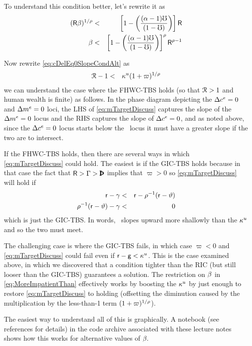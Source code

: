 \message{ !name(TractableBufferStock.tex)}\documentclass{handout}
\begin{document}
To understand this condition better, let's rewrite it as 
\begin{eqnarray}
    (\mathsf{R} \beta)^{1/\rho} & < & \left[1-\left(\frac{(\alpha-1)\mho}{ (1-\mho)}\right)\right]\mathsf{R}
\\  \beta & < & \left[1-\left(\frac{(\alpha-1)\mho}{ (1-\mho)}\right)\right]^{\rho}\mathsf{R}^{\rho-1} \label{eq:MoreImpatientThan}
\end{eqnarray}

Now rewrite \eqref{eq:cDelEq0SlopeCondAlt} as 
\begin{eqnarray}
  \mathcal{R}-1 & < & \kappa^{u} (1+\varpi)^{1/\rho} \label{eq:mTargetDiscuss}
\end{eqnarray}
we can understand the case where the FHWC-TBS holds (so that $\mathcal{R} > 1$ and human wealth is finite) as follows.
In the phase diagram depicting the $\Delta c^{e}=0$ and $\Delta m^{e}=0$ loci, the LHS of \eqref{eq:mTargetDiscuss} 
captures the slope of the $\Delta m^{e}=0$ locus and the RHS captures the slope of $\Delta c^{e}=0$, and as noted
above, since the $\Delta c^{e}=0$ locus starts below the \dmEqZero~locus it must have a greater slope if the two 
are to intersect.  

If the FHWC-TBS holds, then there are several ways in which \eqref{eq:mTargetDiscuss} could hold.  The easiest is if the GIC-TBS holds because in that case the fact that $\Rfree > \PGro > \Pat$ implies that $\varpi>0$ so \eqref{eq:mTargetDiscuss} will hold if 
\begin{eqnarray}
      \mathsf{r} - \gamma & < & \mathsf{r} - \rho^{-1}(\mathsf{r} - \vartheta)
\\    \rho^{-1}(\mathsf{r} - \vartheta) - \gamma & < & 0
\end{eqnarray}
which is just the GIC-TBS.  In words, \dmEqZero~slopes upward more shallowly than the $\kappa^{u}$ and so the two must meet.

The challenging case is where the GIC-TBS fails, in which case $\varpi < 0$ and \eqref{eq:mTargetDiscuss} could fail even 
if $\mathsf{r} - \mathsf{g} < \kappa^{u}$.  This is the case examined above, in which we discovered that a condition tighter than 
the RIC (but still looser than the GIC-TBS) guarantees a solution.  The restriction on $\beta$ in \eqref{eq:MoreImpatientThan}
effectively works by boosting the $\kappa^{u}$ by just enough to restore \eqref{eq:mTargetDiscuss} to holding (offsetting the diminution
caused by the multiplication by the less-than-1 term $(1+\varpi)^{1/\rho}$).  

The easiest way to understand all of this is graphically.  A notebook \cite{FHWCTBS-And-GICTBS-Fail} (see references for details) in the code archive associated with these lecture notes shows how this works for alternative values of $\beta.$
\end{document}
